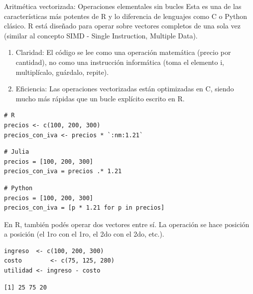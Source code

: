 \documentclass[8pt]{beamer}
\begin{document}
\begin{frame}[fragile]{Aritmética vectorizada: Operaciones elementales sin bucles}
	Esta es una de las características más potentes de R y lo diferencia de lenguajes como C o Python clásico. R está diseñado para operar sobre vectores completos de una sola vez (similar al concepto SIMD - Single Instruction, Multiple Data).
	
	\begin{enumerate}
		\item Claridad: El código se lee como una operación matemática (\guillemetleft precio por cantidad\guillemetright ), no como una instrucción informática (\guillemetleft toma el elemento i, multiplícalo, guárdalo, repite\guillemetright ).
		\item Eficiencia: Las operaciones vectorizadas están optimizadas en C, siendo mucho más rápidas que un bucle explícito escrito en R.
	\end{enumerate}
	
\begin{lstlisting}[style=RScript]
# R
precios <- c(100, 200, 300)
precios_con_iva <- precios * `:nm:1.21`
\end{lstlisting}

\begin{lstlisting}[style=JuliaScript]
# Julia
precios = [100, 200, 300]
precios_con_iva = precios .* 1.21
\end{lstlisting}

\begin{lstlisting}[style=PythonScript]
# Python
precios = [100, 200, 300]
precios_con_iva = [p * 1.21 for p in precios]
\end{lstlisting}
\end{frame}



\begin{frame}[fragile]
	En R, también pod\'es operar dos vectores entre sí. La operación se hace posición a posición (el 1ro con el 1ro, el 2do con el 2do, etc.).
\begin{lstlisting}[style=RScript]
ingreso  <- c(100, 200, 300)
costo		 <- c(75, 125, 280)
utilidad <- ingreso - costo
\end{lstlisting}
\begin{lstlisting}[style=RConsole]
[1] 25 75 20
\end{lstlisting}
\end{frame}
\end{document}

